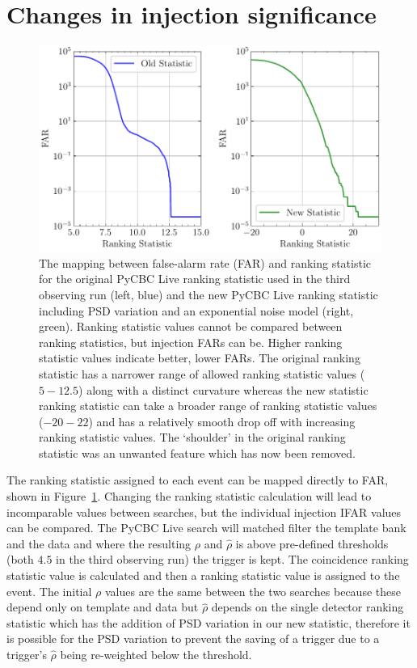 \section{\label{5:sec:injection-investigations}Changes in injection significance}


\begin{figure}
      \centering
    \includegraphics[width=1.0\textwidth]{images/5_pycbclive/plots/fits_psd_far_vs_stat.pdf}
    \caption{The mapping between false-alarm rate (FAR) and ranking statistic for the original PyCBC Live ranking statistic used in the third observing run (left, blue) and the new PyCBC Live ranking statistic including PSD variation and an exponential noise model (right, green). Ranking statistic values cannot be compared between ranking statistics, but injection FARs can be. Higher ranking statistic values indicate better, lower FARs. The original ranking statistic has a narrower range of allowed ranking statistic values ($5 - 12.5$) along with a distinct curvature whereas the new statistic ranking statistic can take a broader range of ranking statistic values ($-20-22$) and has a relatively smooth drop off with increasing ranking statistic values. The `shoulder' in the original ranking statistic was an unwanted feature which has now been removed.}
    \label{5:fig:fits-psdvar-far-stat}
\end{figure}
%
The ranking statistic assigned to each event can be mapped directly to FAR, shown in Figure~\ref{5:fig:fits-psdvar-far-stat}. Changing the ranking statistic calculation will lead to incomparable values between searches, but the individual injection IFAR values can be compared. The PyCBC Live search will matched filter the template bank and the data and where the resulting $\rho$ and $\hat{\rho}$ is above pre-defined thresholds (both $4.5$ in the third observing run) the trigger is kept. The coincidence ranking statistic value is calculated and then a ranking statistic value is assigned to the event. The initial $\rho$ values are the same between the two searches because these depend only on template and data but $\hat{\rho}$ depends on the single detector ranking statistic which has the addition of PSD variation in our new statistic, therefore it is possible for the PSD variation to prevent the saving of a trigger due to a trigger's $\hat{\rho}$ being re-weighted below the threshold.

